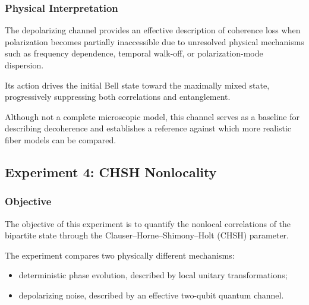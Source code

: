 \documentclass[a4paper]{article}
\begin{document}
\subsubsection{Physical Interpretation}

The depolarizing channel provides an effective description of coherence loss when polarization becomes partially inaccessible due to unresolved physical mechanisms such as frequency dependence, temporal walk-off, or polarization-mode dispersion.

Its action drives the initial Bell state toward the maximally mixed state, progressively suppressing both correlations and entanglement.

Although not a complete microscopic model, this channel serves as a baseline for describing decoherence and establishes a reference against which more realistic fiber models can be compared.



\newpage

\subsection{Experiment 4: CHSH Nonlocality}


\subsubsection{Objective}

The objective of this experiment is to quantify the nonlocal correlations of the bipartite state through the Clauser--Horne--Shimony--Holt (CHSH) parameter.

\medskip

The experiment compares two physically different mechanisms:

\begin{itemize}
    \item deterministic phase evolution, described by local unitary transformations;
    \item depolarizing noise, described by an effective two-qubit quantum channel.
\end{itemize}

\medskip
\end{document}
